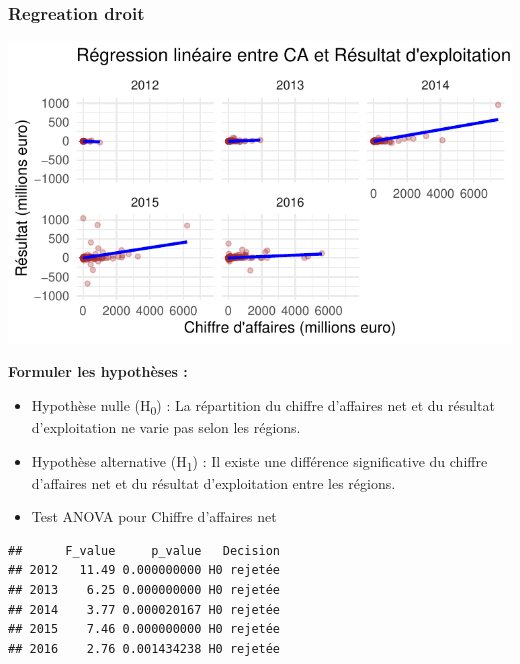 \documentclass[mstat,12pt]{unswthesis}
\begin{document}
\newpage

\subsubsection{Regreation droit}\label{regreation-droit}

\includegraphics{TDDT_projet_L_2_files/figure-latex/reg_droit-1.pdf}

\medskip

\textbf{Formuler les hypothèses :}

\bigskip

\begin{itemize}
\tightlist
\item
  Hypothèse nulle (H\textsubscript{0}) : La répartition du chiffre
  d'affaires net et du résultat d'exploitation ne varie pas selon les
  régions. \medskip
\item
  Hypothèse alternative (H\textsubscript{1}) : Il existe une différence
  significative du chiffre d'affaires net et du résultat d'exploitation
  entre les régions.
\end{itemize}

\medskip

\begin{itemize}
\tightlist
\item
  Test ANOVA pour Chiffre d'affaires net
\end{itemize}

\medskip

\begin{verbatim}
##      F_value     p_value   Decision
## 2012   11.49 0.000000000 H0 rejetée
## 2013    6.25 0.000000000 H0 rejetée
## 2014    3.77 0.000020167 H0 rejetée
## 2015    7.46 0.000000000 H0 rejetée
## 2016    2.76 0.001434238 H0 rejetée
\end{verbatim}
\end{document}
